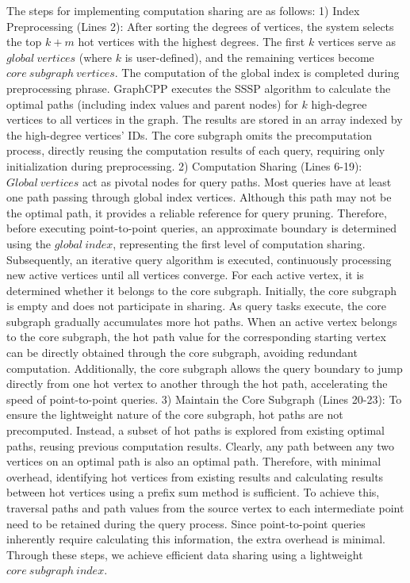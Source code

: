 \documentclass[lettersize,journal]{IEEEtran} %
\begin{document}
The steps for implementing computation sharing are as follows:
1) Index Preprocessing (Lines 2): After sorting the degrees of vertices, the system selects the top $k+m$ hot vertices with the highest degrees. The first $k$ vertices serve as $global~vertices$ (where $k$ is user-defined), and the remaining vertices become $core~subgraph~vertices$. The computation of the global index is completed during preprocessing phrase. GraphCPP executes the SSSP algorithm to calculate the optimal paths (including index values and parent nodes) for $k$ high-degree vertices to all vertices in the graph. The results are stored in an array indexed by the high-degree vertices' IDs. The core subgraph omits the precomputation process, directly reusing the computation results of each query, requiring only initialization during preprocessing.
2) Computation Sharing (Lines 6-19): $Global~vertices$ act as pivotal nodes for query paths. Most queries have at least one path passing through global index vertices. Although this path may not be the optimal path, it provides a reliable reference for query pruning. Therefore, before executing point-to-point queries, an approximate boundary is determined using the $global~index$, representing the first level of computation sharing. Subsequently, an iterative query algorithm is executed, continuously processing new active vertices until all vertices converge. For each active vertex, it is determined whether it belongs to the core subgraph. Initially, the core subgraph is empty and does not participate in sharing. As query tasks execute, the core subgraph gradually accumulates more hot paths. When an active vertex belongs to the core subgraph, the hot path value for the corresponding starting vertex can be directly obtained through the core subgraph, avoiding redundant computation. Additionally, the core subgraph allows the query boundary to jump directly from one hot vertex to another through the hot path, accelerating the speed of point-to-point queries.
3) Maintain the Core Subgraph (Lines 20-23): To ensure the lightweight nature of the core subgraph, hot paths are not precomputed. Instead, a subset of hot paths is explored from existing optimal paths, reusing previous computation results. Clearly, any path between any two vertices on an optimal path is also an optimal path. Therefore, with minimal overhead, identifying hot vertices from existing results and calculating results between hot vertices using a prefix sum method is sufficient. To achieve this, traversal paths and path values from the source vertex to each intermediate point need to be retained during the query process. Since point-to-point queries inherently require calculating this information, the extra overhead is minimal. Through these steps, we achieve efficient data sharing using a lightweight $core~subgraph~index$.
\end{document}
